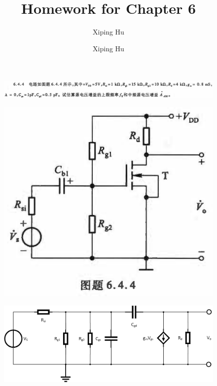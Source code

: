 \documentclass{article}
\author{Xiping Hu}
\author{Xiping Hu}
\affil{https://hxp.plus/}
\title{Homework for Chapter 6}
\begin{document}
\maketitle

\begin{figure}[H]
  \centering
  \includegraphics[width=\linewidth]{figures/Problem644}
  \label{fig:}
\end{figure}

\begin{figure}[H]
  \centering
  \includegraphics[width=0.4\linewidth]{figures/Problem6441}
  \label{fig:}
\end{figure}

\begin{figure}[H]
  \centering
  \includegraphics[width=0.5\linewidth]{figures/Problem6442}
  \label{fig:}
\end{figure}
\end{document}
